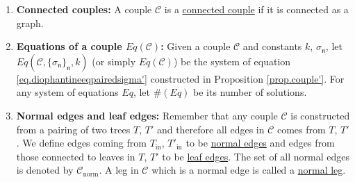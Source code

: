 \begin{defn}\label{def.morecouple}
\begin{enumerate}
    \item \textbf{Connected couples:} A couple $\mathcal{C}$ is a \underline{connected couple} if it is connected as a graph.  
    \item \textbf{Equations of a couple $Eq(\mathcal{C})$:} Given a couple $\mathcal{C}$ and constants $k$, $\sigma_{\mathfrak{n}}$, let $Eq(\mathcal{C},\{\sigma_{\mathfrak{n}}\}_{\mathfrak{n}}, k)$ (or simply $Eq(\mathcal{C})$) be the system of equation \eqref{eq.diophantineeqpairedsigma'} constructed in Proposition \ref{prop.couple'}. For any system of equations $Eq$, let $\#(Eq)$ be its number of solutions.
    \item \textbf{Normal edges and leaf edges:} Remember that any couple $\mathcal{C}$ is constructed from a pairing of two trees $T$, $T'$ and therefore all edges in $\mathcal{C}$ comes from $T$, $T'$. We define edges coming from $T_{\text{in}}$, $T'_{\text{in}}$ to be \underline{normal edges} and edges from those connected to leaves in $T$, $T'$ to be \underline{leaf edges}. The set of all normal edges is denoted by $\mathcal{C}_{\text{norm}}$. A leg in $\mathcal{C}$ which is a normal edge is called a \underline{normal leg}.
\end{enumerate}
\end{defn}


